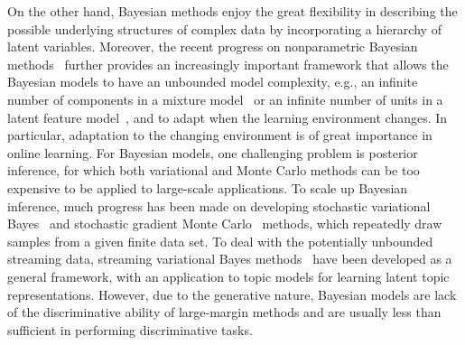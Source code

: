 \documentclass[twoside,11pt]{article}
\begin{document}
On the other hand, Bayesian methods enjoy the great flexibility in describing the possible underlying structures of complex data by incorporating a hierarchy of latent variables. Moreover, the recent progress on nonparametric Bayesian methods~\citep{hjort2010bayesian,teh2006hierarchical} further provides an increasingly important framework that allows the Bayesian models to have an unbounded model complexity, e.g., an infinite number of components in a mixture model~\citep{hjort2010bayesian} or an infinite number of units in a latent feature model~\citep{Griffiths:tr05}, and to adapt when the learning environment changes. In particular, adaptation to the changing environment is of great importance in online learning. For Bayesian models, one challenging problem is posterior inference, for which both variational and Monte Carlo methods can be too expensive to be applied to large-scale applications. To scale up Bayesian inference, much progress has been made on developing stochastic variational Bayes~\citep{hoffman2013stochastic,mimno2012sparse} and stochastic gradient Monte Carlo~\citep{welling2011bayesian,welling2012mc} methods, which repeatedly draw samples from a given finite data set. To deal with the potentially unbounded streaming data, streaming variational Bayes methods~\citep{broderick2013streaming} have been developed as a general framework, with an application to topic models for learning latent topic representations. However, due to the generative nature, Bayesian models are lack of the discriminative ability of large-margin methods and are usually less than sufficient in performing discriminative tasks.
\end{document}
